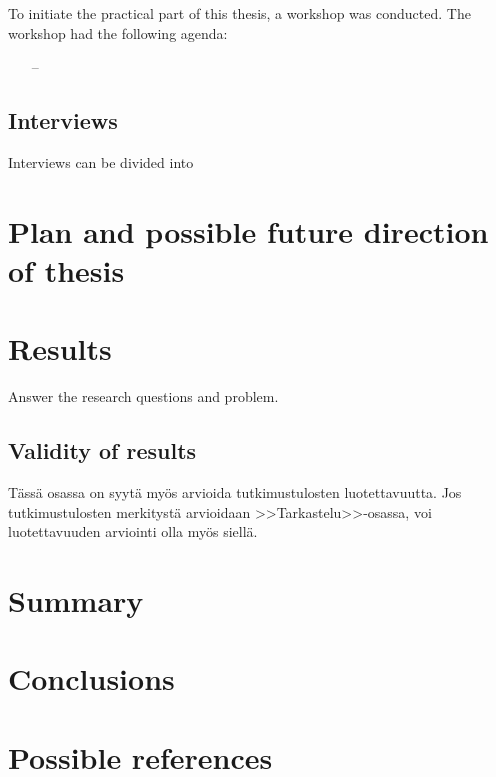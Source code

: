 \documentclass[english, 12pt, a4paper, sci, utf8, a-1b, online]{aaltothesis}
\begin{document}
To initiate the practical part of this thesis, a workshop was conducted. The workshop had the following agenda:

\begin{itemize}
  \item [--] 
\end{itemize}

\subsection{Interviews}

Interviews can be divided into 

\clearpage
\section{Plan and possible future direction of thesis}



\clearpage
\section{Results}

Answer the research questions and problem.

\subsection{Validity of results}

T\"ass\"a osassa on syyt\"a my\"os arvioida tutkimustulosten luotettavuutta.
Jos tutkimustulosten merkityst\"a arvioidaan >>Tarkastelu>>-osassa,
voi luotettavuuden arviointi olla my\"os siell\"a.

\clearpage
\section{Summary}

\clearpage
\section{Conclusions}

\clearpage
\section{Possible references}
\end{document}
